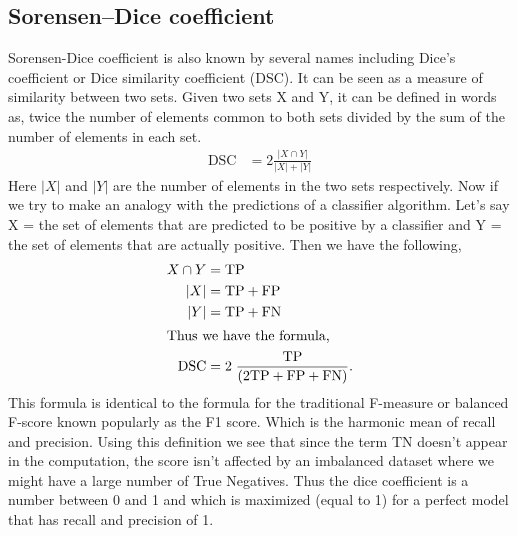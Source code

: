 \documentclass{../template/texnote}
\begin{document}
\subsection{Sorensen–Dice coefficient}
Sorensen-Dice coefficient is also known by several names including Dice's coefficient or Dice similarity coefficient (DSC). It can be seen as a measure of similarity between two sets.
Given two sets X and Y, it can be defined in words as, twice the number of elements common to both sets divided by the sum of the number of elements in each set. 
\begin{align}
    \textrm{DSC} &= 2 \frac{| X \cap Y|}{|X| + |Y|}
\end{align}
Here \(|X|\) and \(|Y|\) are the number of elements in the two sets respectively.
Now if we try to make an analogy with the predictions of a classifier algorithm.
Let's say X = the set of elements that are predicted to be positive by a classifier and Y = the set of elements that are actually positive.
Then we have the following, 
\begin{align}
    X \cap Y &= \textrm{TP} \\
    | X |  &=  \textrm{TP} + \textrm{FP} \\
    | Y |  &= \textrm{TP} + \textrm{FN}  \\
    \intertext{Thus we have the formula,}
    \textrm{DSC} &= 2 \; \frac{\textrm{TP}}{( 2 \textrm{TP} + \textrm{FP} + \textrm{FN})}.
\end{align}
This formula is identical to the formula for the traditional F-measure or balanced F-score known popularly as the F1 score.
Which is the harmonic mean of recall and precision. 
Using this definition we see that since the term TN doesn't appear in the computation, the score isn't affected by an imbalanced dataset where we might have a large number of True Negatives.
Thus the dice coefficient is a number  between 0 and 1 and which is maximized (equal to 1)  for  a perfect model that has recall and precision of 1.
\end{document}
